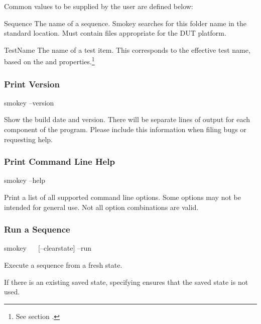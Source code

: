 Common values to be supplied by the user are defined below:

\begin{Definition}

	\item[Sequence] The name of a sequence.  Smokey searches for this
	folder name in the standard location.  Must contain files appropriate
	for the DUT platform.

	\item[TestName] The name of a test item.  This corresponds to the
	effective test name, based on the  and
	 properties.\footnote{See section
	.}

\end{Definition}

\subsubsection{Print Version}

\begin{CommandLine}
smokey --version
\end{CommandLine}

Show the build date and version.  There will be separate lines of output for
each component of the program.  Please include this information when filing
bugs or requesting help.

\subsubsection{Print Command Line Help}

\begin{CommandLine}
smokey --help
\end{CommandLine}

Print a list of all supported command line options.  Some options may not be
intended for general use.  Not all option combinations are valid.

\subsubsection{Run a Sequence}

\begin{CommandLine}
smokey ~~ [--clearstate] --run
\end{CommandLine}

Execute a sequence from a fresh state.

If there is an existing saved state, specifying  ensures
that the saved state is not used.

